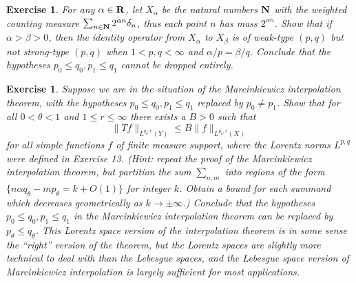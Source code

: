 \documentclass[10pt,reqno]{amsart}
\newtheorem{exercise}[theorem]{Exercise}
\begin{document}
\begin{exercise}
    For any $\alpha \in {\bf R}$, let $X_\alpha$ be the natural numbers ${\bf N}$ with the weighted counting measure $\sum_{n \in {\bf N}} 2^{\alpha n} \delta_n$, thus each point $n$ has mass $2^{\alpha n}$. Show that if $\alpha > \beta > 0$, then the identity operator from $X_\alpha$ to $X_\beta$ is of weak-type $(p,q)$ but not strong-type $(p,q)$ when $1 < p,q < \infty$ and $\alpha/p = \beta/q$. Conclude that the hypotheses $p_0 \leq q_0, p_1 \leq q_1$ cannot be dropped entirely. 
\end{exercise}

\begin{exercise}
     Suppose we are in the situation of the Marcinkiewicz interpolation theorem, with the hypotheses $p_0 \leq q_0, p_1 \leq q_1$ replaced by $p_0 \neq p_1$. Show that for all $0 < \theta < 1$ and $1 \leq r \leq \infty$ there exists a $B > 0$ such that
\[     \| T f \|_{L^{q_\theta,r}(Y)} \leq B \|f\|_{L^{p_\theta,r}(X)}\]
    for all simple functions $f$ of finite measure support, where the Lorentz norms $L^{p,q}$ were defined in Exercise 13. (Hint: repeat the proof of the Marcinkiewicz interpolation theorem, but partition the sum $\sum_{n,m}$ into regions of the form $\{ n \alpha q_\theta - m p_\theta = k + O(1) \}$ for integer $k$. Obtain a bound for each summand which decreases geometrically as $k \rightarrow \pm \infty$.) Conclude that the hypotheses $p_0 \leq q_0, p_1 \leq q_1$ in the Marcinkiewicz interpolation theorem can be replaced by $p_\theta \leq q_\theta$. This Lorentz space version of the interpolation theorem is in some sense the “right” version of the theorem, but the Lorentz spaces are slightly more technical to deal with than the Lebesgue spaces, and the Lebesgue space version of Marcinkiewicz interpolation is largely sufficient for most applications. 
\end{exercise}
\end{document}
